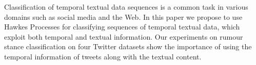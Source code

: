 Classification of temporal textual data sequences is a common task in various domains such as social media and the Web. In this paper we propose to use Hawkes Processes for classifying sequences of temporal textual data, which exploit both temporal and textual information. Our experiments on rumour stance classification on four Twitter datasets show the importance of using the temporal information of tweets along with the textual content.
